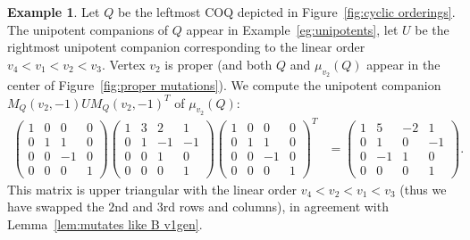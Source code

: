 \documentclass[11pt, letterpaper]{amsart}
\theoremstyle{definition}
\newtheorem{example}[theorem]{Example}
\numberwithin{equation}{section}
\begin{document}
\begin{example}
Let $Q$ be the leftmost COQ depicted in Figure~\ref{fig:cyclic orderings}.
The unipotent companions of $Q$ appear in Example~\ref{eg:unipotents}, let $U$ be the rightmost unipotent companion corresponding to the linear order $v_4 < v_1 < v_2 < v_3$.
Vertex $v_2$ is proper (and both $Q$ and $\mu_{v_2}(Q)$ appear in the center of Figure~\ref{fig:proper mutations}).
We compute the unipotent companion $M_Q(v_2, -1) U M_Q(v_2, -1)^T$ of $\mu_{v_2}(Q)$:
\begin{align*}  
\begin{pmatrix} 
1 & 0 & 0 & 0 \\
0 & 1 & 1 & 0 \\
0 & 0 & -1 & 0 \\
0 & 0 & 0 & 1
\end{pmatrix} 
\begin{pmatrix} 1 & 3 &  2 & 1 \\ 0 & 1 & -1 & -1 \\ 0 & 0 & 1 & 0\\ 0 & 0 & 0 & 1 \end{pmatrix}
\begin{pmatrix}
1 & 0 & 0 & 0 \\
0 & 1 & 1 & 0 \\
0 & 0 & -1 & 0 \\
0 & 0 & 0 & 1
\end{pmatrix}^T
&= \begin{pmatrix}
1 & 5 & -2 & 1 \\
0 & 1 & 0 & -1 \\
0 & -1 & 1 & 0 \\
0 & 0 & 0 & 1
\end{pmatrix}.
\end{align*}
This matrix is upper triangular with the linear order $v_4 < v_2 < v_1  < v_3$ (thus we have swapped the $2$nd and $3$rd rows and columns), in agreement with Lemma~\ref{lem:mutates like B v1gen}. 


\end{example}
\end{document}
